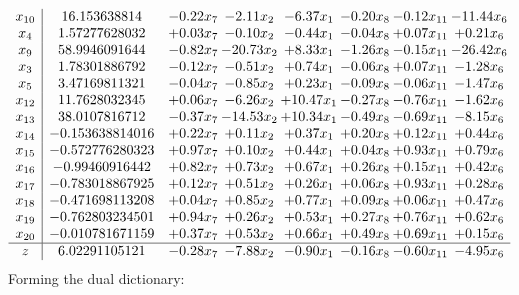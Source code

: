 \documentclass[8pt]{article}
\begin{document}
\[\begin{array}{c| c c@{\hskip 2pt} c@{\hskip 2pt} c@{\hskip 2pt} c@{\hskip 2pt} c@{\hskip 2pt} c@{\hskip 2pt} }
 x_{10}   &  16.153638814 & -0.22 x_{7} & -2.11 x_{2} & -6.37 x_{1} & -0.20 x_{8} & -0.12 x_{11} & -11.44 x_{6}\\
 x_{4}   &  1.57277628032 & +  0.03 x_{7} & -0.10 x_{2} & -0.44 x_{1} & -0.04 x_{8} & +  0.07 x_{11} & +  0.21 x_{6}\\
 x_{9}   &  58.9946091644 & -0.82 x_{7} & -20.73 x_{2} & +  8.33 x_{1} & -1.26 x_{8} & -0.15 x_{11} & -26.42 x_{6}\\
 x_{3}   &  1.78301886792 & -0.12 x_{7} & -0.51 x_{2} & +  0.74 x_{1} & -0.06 x_{8} & +  0.07 x_{11} & -1.28 x_{6}\\
 x_{5}   &  3.47169811321 & -0.04 x_{7} & -0.85 x_{2} & +  0.23 x_{1} & -0.09 x_{8} & -0.06 x_{11} & -1.47 x_{6}\\
 x_{12}   &  11.7628032345 & +  0.06 x_{7} & -6.26 x_{2} & + 10.47 x_{1} & -0.27 x_{8} & -0.76 x_{11} & -1.62 x_{6}\\
 x_{13}   &  38.0107816712 & -0.37 x_{7} & -14.53 x_{2} & + 10.34 x_{1} & -0.49 x_{8} & -0.69 x_{11} & -8.15 x_{6}\\
 x_{14}   &  -0.153638814016 & +  0.22 x_{7} & +  0.11 x_{2} & +  0.37 x_{1} & +  0.20 x_{8} & +  0.12 x_{11} & +  0.44 x_{6}\\
 x_{15}   &  -0.572776280323 & +  0.97 x_{7} & +  0.10 x_{2} & +  0.44 x_{1} & +  0.04 x_{8} & +  0.93 x_{11} & +  0.79 x_{6}\\
 x_{16}   &  -0.99460916442 & +  0.82 x_{7} & +  0.73 x_{2} & +  0.67 x_{1} & +  0.26 x_{8} & +  0.15 x_{11} & +  0.42 x_{6}\\
 x_{17}   &  -0.783018867925 & +  0.12 x_{7} & +  0.51 x_{2} & +  0.26 x_{1} & +  0.06 x_{8} & +  0.93 x_{11} & +  0.28 x_{6}\\
 x_{18}   &  -0.471698113208 & +  0.04 x_{7} & +  0.85 x_{2} & +  0.77 x_{1} & +  0.09 x_{8} & +  0.06 x_{11} & +  0.47 x_{6}\\
 x_{19}   &  -0.762803234501 & +  0.94 x_{7} & +  0.26 x_{2} & +  0.53 x_{1} & +  0.27 x_{8} & +  0.76 x_{11} & +  0.62 x_{6}\\
 x_{20}   &  -0.010781671159 & +  0.37 x_{7} & +  0.53 x_{2} & +  0.66 x_{1} & +  0.49 x_{8} & +  0.69 x_{11} & +  0.15 x_{6}\\
\hline
z    &  6.02291105121 & -0.28 x_{7} & -7.88 x_{2} & -0.90 x_{1} & -0.16 x_{8} & -0.60 x_{11} & -4.95 x_{6}\\
\end{array}\]
Forming the dual dictionary:
\end{document}
